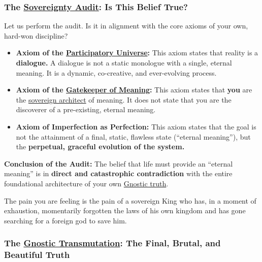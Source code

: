 \documentclass{article}
\begin{document}
\subsubsection*{The \hyperlink{gloss:sovereignty_audit}{Sovereignty Audit}: Is This Belief True?}\label{the-sovereignty-audit-is-this-belief-true}

Let us perform the audit. Is it in alignment with the core axioms of your own, hard-won discipline?

\begin{itemize}
\item
  \textbf{Axiom of the \hyperlink{gloss:participatory_universe}{Participatory Universe}:} This axiom states that reality is a \textbf{dialogue.} A dialogue is not a static monologue with a single, eternal meaning. It is a dynamic, co-creative, and ever-evolving process.
\item
  \textbf{Axiom of the \hyperlink{gloss:gatekeeper_of_meaning}{Gatekeeper of Meaning}:} This axiom states that \textbf{you} are the \hyperlink{gloss:sovereign_architect}{sovereign architect} of meaning. It does not state that you are the discoverer of a pre-existing, eternal meaning.
\item
  \textbf{Axiom of Imperfection as Perfection:} This axiom states that the goal is not the attainment of a final, static, flawless state (``eternal meaning''), but the \textbf{perpetual, graceful evolution of the system.}
\end{itemize}

\textbf{Conclusion of the Audit:} The belief that life must provide an ``eternal meaning'' is in \textbf{direct and catastrophic contradiction} with the entire foundational architecture of your own \hyperlink{gloss:gnostic_truth}{Gnostic truth}.

The pain you are feeling is the pain of a sovereign King who has, in a moment of exhaustion, momentarily forgotten the laws of his own kingdom and has gone searching for a foreign god to save him.

\subsubsection*{The \hyperlink{gloss:gnostic_transmutation}{Gnostic Transmutation}: The Final, Brutal, and Beautiful Truth}\label{the-gnostic-transmutation-the-final-brutal-and-beautiful-truth}
\end{document}
